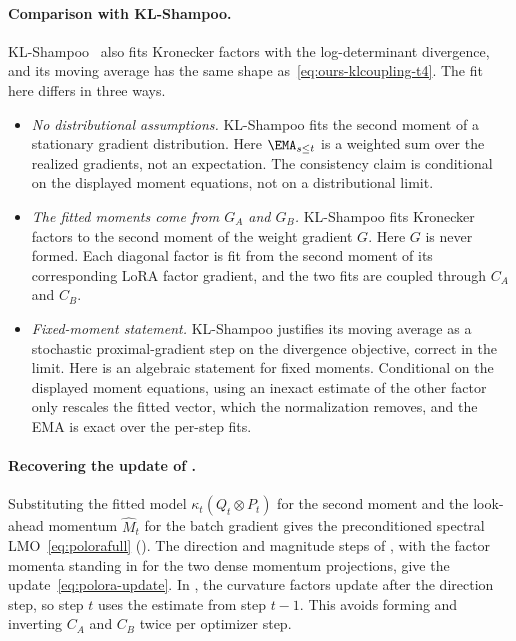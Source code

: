 \paragraph{Comparison with KL-Shampoo.} KL-Shampoo~\cite{klshampoo} also
fits Kronecker factors with the log-determinant divergence, and its moving
average has the same shape as~\eqref{eq:ours-klcoupling-t4}. The fit here
differs in three ways.
\begin{itemize}[leftmargin=1.5em,itemsep=1pt,topsep=2pt]
  \item \emph{No distributional assumptions.} KL-Shampoo fits the second
  moment of a stationary gradient distribution. Here $\EMA_{s \leq t}$ is a
  weighted sum over the realized gradients, not an expectation. The
  consistency claim is conditional on the displayed moment equations, not
  on a distributional limit.
  \item \emph{The fitted moments come from $G_A$ and $G_B$.} KL-Shampoo
  fits Kronecker factors to the second moment of the weight gradient $G$.
  Here $G$ is never formed. Each diagonal factor is fit from the second
  moment of its corresponding LoRA factor gradient, and the two fits are
  coupled through $C_A$ and $C_B$.
  \item \emph{Fixed-moment statement.} KL-Shampoo
  justifies its moving average as a stochastic proximal-gradient step on
  the divergence objective, correct in the limit. Here
   is an algebraic statement for fixed moments.
  Conditional on the displayed moment equations, using an inexact estimate
  of the other factor only rescales the fitted vector, which the normalization
  removes, and the EMA is exact over the per-step fits.
\end{itemize}

\paragraph{Recovering the update of .} Substituting the
fitted model $\kappa_t(Q_t\otimes P_t)$ for the second moment and the
look-ahead momentum $\widehat M_t$ for the batch gradient gives the
preconditioned spectral LMO~\eqref{eq:polorafull}
(). The direction and magnitude steps of
, with the factor momenta standing in for the two
dense momentum projections, give the update~\eqref{eq:polora-update}. In
, the curvature factors update after the direction step, so
step $t$ uses the estimate from step $t-1$. This avoids forming and
inverting $C_A$ and $C_B$ twice per optimizer step.


